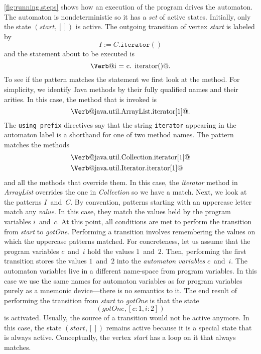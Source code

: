 \documentclass[preprint]{sigplanconf} %
\makeatletter
\newcommand{\verbline}[2][]{\[\text{\Verb@#2@}#1\]}
\theoremstyle{definition}
\makeatother
\begin{document}
\autoref{fig:running.steps} shows how an execution of the program drives the automaton.
The automaton is nondeterministic so it has a \emph{set} of active states.
Initially, only the state $(\mathit{start},[])$ is active.
The outgoing transition of vertex \textit{start} is labeled by \[I:=C.\mathtt{iterator}()\] and the statement about to be executed is \verbline[.]{i = c.\PY{n+na}{iterator}()}
To see if the pattern matches the statement we first look at the method.
For simplicity, we identify Java methods by their fully qualified names and their arities.
In this case, the method that is invoked is \verbline[.]{java.util.ArrayList.iterator[1]}
The \texttt{using prefix} directives say that the string \texttt{iterator} appearing in the automaton label is a shorthand for one of two method names.
The pattern matches the methods
\begin{align*}
&\text{\Verb@java.util.Collection.iterator[1]@} \\
&\text{\Verb@java.util.Iterator.iterator[1]@}
\end{align*}
and all the methods that override them.
In this case, the \textit{iterator} method in \textit{ArrayList} overrides the one in \textit{Collection} so we have a match.
Next, we look at the patterns $I$~and~$C$.
By convention, patterns starting with an uppercase letter match any \emph{value}.
In this case, they match the values held by the program variables $i$~and~$c$.
At this point, all conditions are met to perform the transition from \textit{start} to \textit{gotOne}.
Performing a transition involves remembering the values on which the uppercase patterns matched.
For concreteness, let us assume that the program variables $c$~and~$i$ hold the values $1$~and~$2$.
Then, performing the first transition stores the values $1$~and~$2$ into the \emph{automaton variables} $c$~and~$i$.
The automaton variables live in a different name-space from program variables.
In this case we use the same names for automaton variables as for program variables purely as a mnemonic device---there is no semantics to it.
The end result of performing the transition from \textit{start} to \textit{gotOne} is that the state \[(\mathit{gotOne},[c:1,i:2])\] is activated.
Usually, the source of a transition would not be active anymore.
In this case, the state $(\mathit{start},[])$ remains active because it is a special state that is always active.
Conceptually, the vertex \textit{start} has a loop on it that always matches.
\end{document}
